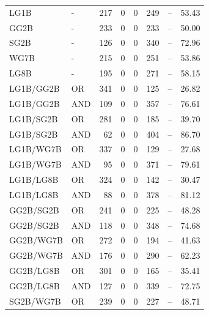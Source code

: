 \documentclass{article}
\begin{document}
{\begin{longtable}{llrrrrrr}
LG1B                     & -       &  217 &    0 &    0 &  249 & --    & 53.43             \\
 GG2B                     & -       &  233 &    0 &    0 &  233 & --    & 50.00             \\
 SG2B                     & -       &  126 &    0 &    0 &  340 & --    & 72.96             \\
 WG7B                     & -       &  215 &    0 &    0 &  251 & --    & 53.86             \\
 LG8B                     & -       &  195 &    0 &    0 &  271 & --    & 58.15             \\
 LG1B/GG2B                & OR      &  341 &    0 &    0 &  125 & --    & 26.82             \\
 LG1B/GG2B                & AND     &  109 &    0 &    0 &  357 & --    & 76.61             \\
 LG1B/SG2B                & OR      &  281 &    0 &    0 &  185 & --    & 39.70             \\
 LG1B/SG2B                & AND     &   62 &    0 &    0 &  404 & --    & 86.70             \\
 LG1B/WG7B                & OR      &  337 &    0 &    0 &  129 & --    & 27.68             \\
 LG1B/WG7B                & AND     &   95 &    0 &    0 &  371 & --    & 79.61             \\
 LG1B/LG8B                & OR      &  324 &    0 &    0 &  142 & --    & 30.47             \\
 LG1B/LG8B                & AND     &   88 &    0 &    0 &  378 & --    & 81.12             \\
 GG2B/SG2B                & OR      &  241 &    0 &    0 &  225 & --    & 48.28             \\
 GG2B/SG2B                & AND     &  118 &    0 &    0 &  348 & --    & 74.68             \\
 GG2B/WG7B                & OR      &  272 &    0 &    0 &  194 & --    & 41.63             \\
 GG2B/WG7B                & AND     &  176 &    0 &    0 &  290 & --    & 62.23             \\
 GG2B/LG8B                & OR      &  301 &    0 &    0 &  165 & --    & 35.41             \\
 GG2B/LG8B                & AND     &  127 &    0 &    0 &  339 & --    & 72.75             \\
 SG2B/WG7B                & OR      &  239 &    0 &    0 &  227 & --    & 48.71             \\

\end{longtable}}
\end{document}

